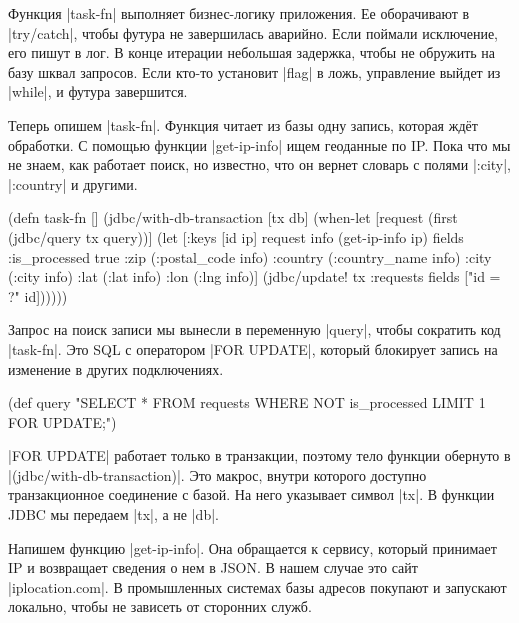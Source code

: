 Функция \spverb|task-fn| выполняет бизнес-логику приложения. Ее оборачивают в
\spverb|try/catch|, чтобы футура не завершилась аварийно. Если поймали
исключение, его пишут в лог. В конце итерации небольшая задержка, чтобы не
обружить на базу шквал запросов. Если кто-то установит \spverb|flag| в ложь,
управление выйдет из \spverb|while|, и футура завершится.

Теперь опишем \spverb|task-fn|. Функция читает из базы одну запись, которая
жд\"{е}т обработки. С помощью функции \spverb|get-ip-info| ищем геоданные по
IP. Пока что мы не знаем, как работает поиск, но известно, что он вернет словарь
с полями \spverb|:city|, \spverb|:country| и другими.

\begin{english}
  \begin{clojure}
(defn task-fn []
  (jdbc/with-db-transaction [tx db]
    (when-let [request (first (jdbc/query tx query))]
      (let [{:keys [id ip]} request
            info   (get-ip-info ip)
            fields {:is_processed true
                    :zip (:postal_code info)
                    :country (:country_name info)
                    :city (:city info)
                    :lat (:lat info)
                    :lon (:lng info)}]
        (jdbc/update! tx :requests
                      fields
                      ["id = ?" id])))))
  \end{clojure}
\end{english}

Запрос на поиск записи мы вынесли в переменную \spverb|query|, чтобы сократить
код \spverb|task-fn|. Это SQL с оператором \spverb|FOR UPDATE|, который
блокирует запись на изменение в других подключениях.

\begin{english}
  \begin{clojure}
(def query
  "SELECT * FROM requests
   WHERE NOT is_processed
   LIMIT 1 FOR UPDATE;")
  \end{clojure}
\end{english}

\spverb|FOR UPDATE| работает только в транзакции, поэтому тело функции обернуто
в \spverb|(jdbc/with-db-transaction)|. Это макрос, внутри которого доступно
транзакционное соединение с базой. На него указывает символ \spverb|tx|. В
функции JDBC мы передаем \spverb|tx|, а не \spverb|db|.

Напишем функцию \spverb|get-ip-info|. Она обращается к сервису, который
принимает IP и возвращает сведения о нем в JSON. В нашем случае это сайт
\spverb|iplocation.com|. В промышленных системах базы адресов покупают и
запускают локально, чтобы не зависеть от сторонних служб.

